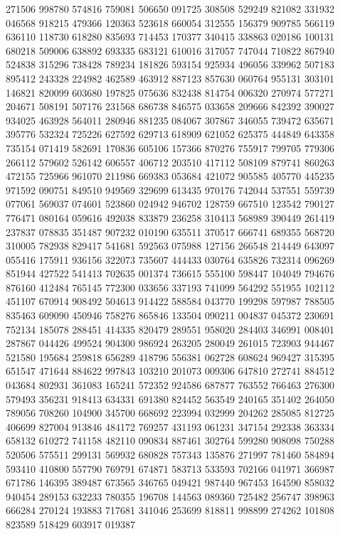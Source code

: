 {271506 998780 574816 759081 506650 091725 308508 529249 821082 331932 046568%
918215 479366 120363 523618 660054 312555 156379 909785 566119 636110 118730%
618280 835693 714453 170377 340415 338863 020186 100131 680218 509006 638892%
693335 683121 610016 317057 747044 710822 867940 524838 315296 738428 789234%
181826 593154 925934 496056 339962 507183 895412 243328 224982 462589 463912%
887123 857630 060764 955131 303101 146821 820099 603680 197825 075636 832438%
814754 006320 270974 577271 204671 508191 507176 231568 686738 846575 033658%
209666 842392 390027 934025 463928 564011 280946 881235 084067 307867 346055%
739472 635671 395776 532324 725226 627592 629713 618909 621052 625375 444849%
643358 735154 071419 582691 170836 605106 157366 870276 755917 799705 779306%
266112 579602 526142 606557 406712 203510 417112 508109 879741 860263 472155%
725966 961070 211986 669383 053684 421072 905585 405770 445235 971592 090751%
849510 949569 329699 613435 970176 742044 537551 559739 077061 569037 074601%
523860 024942 946702 128759 667510 123542 790127 776471 080164 059616 492038%
833879 236258 310413 568989 390449 261419 237837 078835 351487 907232 010190%
635511 370517 666741 689355 568720 310005 782938 829417 541681 592563 075988%
127156 266548 214449 643097 055416 175911 936156 322073 735607 444433 030764%
635826 732314 096269 851944 427522 541413 702635 001374 736615 555100 598447%
104049 794676 876160 412484 765145 772300 033656 337193 741099 564292 551955%
102112 451107 670914 908492 504613 914422 588584 043770 199298 597987 788505%
835463 609090 450946 758276 865846 133504 090211 004837 045372 230691 752134%
185078 288451 414335 820479 289551 958020 284403 346991 008401 287867 044426%
499524 904300 986924 263205 280049 261015 723903 944467 521580 195684 259818%
656289 418796 556381 062728 608624 969427 315395 651547 471644 884622 997843%
103210 201073 009306 647810 272741 884512 043684 802931 361083 165241 572352%
924586 687877 763552 766463 276300 579493 356231 918413 634331 691380 824452%
563549 240165 351402 264050 789056 708260 104900 345700 668692 223994 032999%
204262 285085 812725 406699 827004 913846 484172 769257 431193 061231 347154%
292338 363334 658132 610272 741158 482110 090834 887461 302764 599280 908098%
750288 520506 575511 299131 569932 680828 757343 135876 271997 781460 584894%
593410 410800 557790 769791 674871 583713 533593 702166 041971 366987 671786%
146395 389487 673565 346765 049421 987440 967453 164590 858032 940454 289153%
632233 780355 196708 144563 089360 725482 256747 398963 666284 270124 193883%
717681 341046 253699 818811 998899 274262 101808 823589 518429 603917 019387%
}
